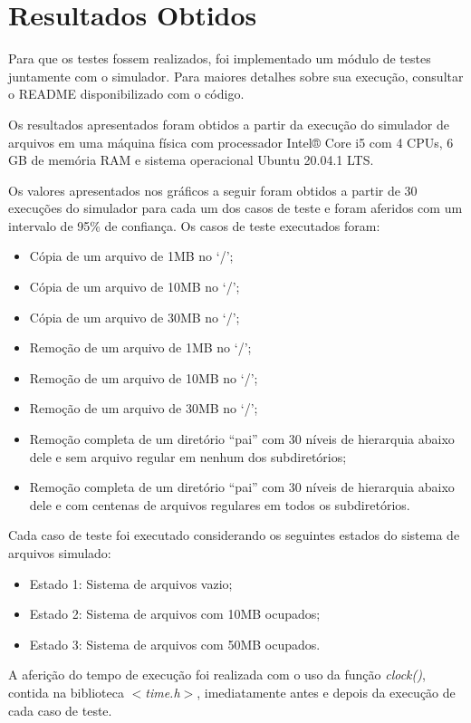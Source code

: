 \documentclass[12pt]{article}
\begin{document}
\section{Resultados Obtidos}

Para que os testes fossem realizados, foi implementado um módulo de testes juntamente com o simulador. Para maiores detalhes sobre sua execução, consultar o README disponibilizado com o código.

Os resultados apresentados foram obtidos a partir da execução do simulador de arquivos em uma máquina física com processador Intel® Core i5 com 4 CPUs, 6 GB de memória RAM e sistema operacional Ubuntu 20.04.1 LTS.

Os valores apresentados nos gráficos a seguir foram obtidos a partir de 30 execuções do simulador para cada um dos casos de teste e foram aferidos com um intervalo de 95\% de confiança. Os casos de teste executados foram:

\begin{itemize}
	\item Cópia de um arquivo de 1MB no ‘/’;
	\item Cópia de um arquivo de 10MB no ‘/’;
	\item Cópia de um arquivo de 30MB no ‘/’;
	\item Remoção de um arquivo de 1MB no ‘/’;
	\item Remoção de um arquivo de 10MB no ‘/’;
	\item Remoção de um arquivo de 30MB no ‘/’;
	\item Remoção completa de um diretório “pai” com 30 níveis de hierarquia abaixo dele e sem arquivo regular em nenhum dos subdiretórios;
	\item Remoção completa de um diretório “pai” com 30 níveis de hierarquia abaixo dele e com centenas de arquivos regulares em todos os subdiretórios.
\end{itemize}

Cada caso de teste foi executado considerando os seguintes estados do sistema de arquivos simulado:

\begin{itemize}
	\item Estado 1: Sistema de arquivos vazio;
	\item Estado 2: Sistema de arquivos com 10MB ocupados;
	\item Estado 3: Sistema de arquivos com 50MB ocupados.
\end{itemize}

A aferição do tempo de execução foi realizada com o uso da função \textit{clock()}, contida na biblioteca \textit{$<$time.h$>$}, imediatamente antes e depois da execução de cada caso de teste.
\end{document}
